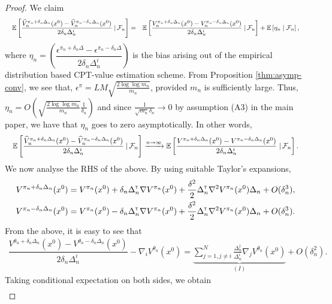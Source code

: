 \begin{proof}
We claim
\begin{align}
\quad\mathbb{E}\left[\dfrac{\widehat V_n^{\pi_n + \delta_n \Delta_n}(x^0) -\widehat V_n^{\pi_n - \delta_n \Delta_n}(x^0)}{2 \delta_n \Delta_n^{i}} \left.\right| \mathcal{F}_n\right] 
= \quad&\mathbb{E}\left[\dfrac{V_n^{\pi_n + \delta_n \Delta_n}(x^0) -V_n^{\pi_n - \delta_n \Delta_n}(x^0)}{2 \delta_n \Delta_n^{i}} \left.\right| \mathcal{F}_n\right] + \mathbb{E}\left[ \eta_n \mid \mathcal{F}_n\right],
\end{align}
where $\eta_n = \left(\dfrac{\epsilon^{\pi_n +\delta_n\Delta} - \epsilon^{\pi_n-\delta_n\Delta}}{2\delta_n\Delta_n^{i}}\right)$
 is the bias arising out of the empirical distribution based CPT-value estimation scheme.
From Proposition \ref{thm:asymp-conv}, we see that, $\epsilon^\pi = LM\sqrt{\frac{2 \log \log m_n}{m_n}}$, provided $m_n$ is sufficiently large.
Thus, $\eta_n = O\left( \sqrt{\frac{2 \log \log m_n}{m_n}} \frac{1}{\delta_n}\right)$ and since $\frac{1}{\sqrt{m_n} \delta_n} \rightarrow 0$ by assumption (A3) in the main paper, we have that
$\eta_n$ goes to zero asymptotically. In other words,
\begin{align}
\quad\mathbb{E}\left[\dfrac{\widehat V_n^{\pi_n + \delta_n \Delta_n}(x^0) -\widehat V_n^{\pi_n - \delta_n \Delta_n}(x^0)}{2 \delta_n \Delta_n^{i}} \left.\right| \mathcal{F}_n\right] 
&\xrightarrow{n\rightarrow\infty}  \mathbb{E}\left[\dfrac{V^{\pi_n + \delta_n \Delta_n}(x^0) -V^{\pi_n - \delta_n \Delta_n}(x^0)}{2 \delta_n \Delta_n^{i}} \left.\right| \mathcal{F}_n\right].  \label{eq:l1}
\end{align}
We now analyse the RHS of the above.
By using suitable Taylor's expansions,
\begin{align*}
V^{\pi_n + \delta_n \Delta_n}(x^0) = V^{\pi_n}(x^0) + \delta_n \Delta_n^\mathsf{\scriptscriptstyle T} \nabla V^{\pi_n}(x^0) + \frac{\delta^2}{2} \Delta_n^\mathsf{\scriptscriptstyle T} \nabla^2 V^{\pi_n}(x^0)\Delta_n + O(\delta_n^3), \\
V^{\pi_n - \delta_n \Delta_n}(x^0) = V^{\pi_n}(x^0) - \delta_n \Delta_n^\mathsf{\scriptscriptstyle T} \nabla V^{\pi_n}(x^0) + \frac{\delta^2}{2} \Delta_n^\mathsf{\scriptscriptstyle T} \nabla^2 V^{\pi_n}(x^0)\Delta_n + O(\delta_n^3).\end{align*}
From the above, it is easy to see that 
\begin{align*}
\dfrac{V^{\theta_n + \delta_n \Delta_n}(x^0) - V^{\theta_n - \delta_n \Delta_n}(x^0)}{2 \delta_n \Delta_n^i}
- \nabla_i V^{\theta_n}(x^0)
=\underbrace{\sum_{j=1,j\not=i}^{N} \frac{\Delta_n^j}{\Delta_n^i}\nabla_j V^{\theta_n}(x^0)}_{(I)} + O(\delta_n^2).
\end{align*}
Taking conditional expectation on both sides, we obtain
\begin{align}

\end{align}
\end{proof}
